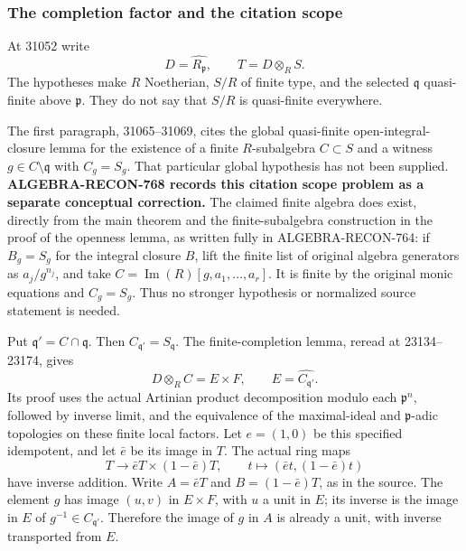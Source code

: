 \subsubsection{The completion factor and the citation scope}\label{algebra-proof-033-the-completion-factor-and-the-citation-scope}

At 31052 write \[
 D=\widehat{R_{\mathfrak p}},\qquad T=D\otimes_R S.
\] The hypotheses make \(R\) Noetherian, \(S/R\) of finite type, and the selected \(\mathfrak q\) quasi-finite above \(\mathfrak p\). They do not say that \(S/R\) is quasi-finite everywhere.

The first paragraph, 31065--31069, cites the global quasi-finite open-integral-closure lemma for the existence of a finite \(R\)-subalgebra \(C\subset S\) and a witness \(g\in C\setminus\mathfrak q\) with \(C_g=S_g\). That particular global hypothesis has not been supplied. \textbf{ALGEBRA-\AlgebraIdentifierBreak{}RECON-\AlgebraIdentifierBreak{}768 records this citation scope problem as a separate conceptual correction.} The claimed finite algebra does exist, directly from the main theorem and the finite-subalgebra construction in the proof of the openness lemma, as written fully in ALGEBRA-\AlgebraIdentifierBreak{}RECON-\AlgebraIdentifierBreak{}764: if \(B_g=S_g\) for the integral closure \(B\), lift the finite list of original algebra generators as \(a_j/g^{n_j}\), and take \(C=\operatorname{Im}(R)[g,a_1,\ldots,a_r]\). It is finite by the original monic equations and \(C_g=S_g\). Thus no stronger hypothesis or normalized source statement is needed.

Put \(\mathfrak q'=C\cap\mathfrak q\). Then \(C_{\mathfrak q'}=S_{\mathfrak q}\). The finite-completion lemma, reread at 23134--23174, gives \[
 D\otimes_R C=E\times F,\qquad
 E=\widehat{C_{\mathfrak q'}}.
\] Its proof uses the actual Artinian product decomposition modulo each \(\mathfrak p^n\), followed by inverse limit, and the equivalence of the maximal-ideal and \(\mathfrak p\)-adic topologies on these finite local factors. Let \(e=(1,0)\) be this specified idempotent, and let \(\bar e\) be its image in \(T\). The actual ring maps \[
 T\longrightarrow \bar eT\times(1-\bar e)T,\qquad
 t\longmapsto(\bar et,(1-\bar e)t)
\] have inverse addition. Write \(A=\bar eT\) and \(B=(1-\bar e)T\), as in the source. The element \(g\) has image \((u,v)\) in \(E\times F\), with \(u\) a unit in \(E\); its inverse is the image in \(E\) of \(g^{-1}\in C_{\mathfrak q'}\). Therefore the image of \(g\) in \(A\) is already a unit, with inverse transported from \(E\).

